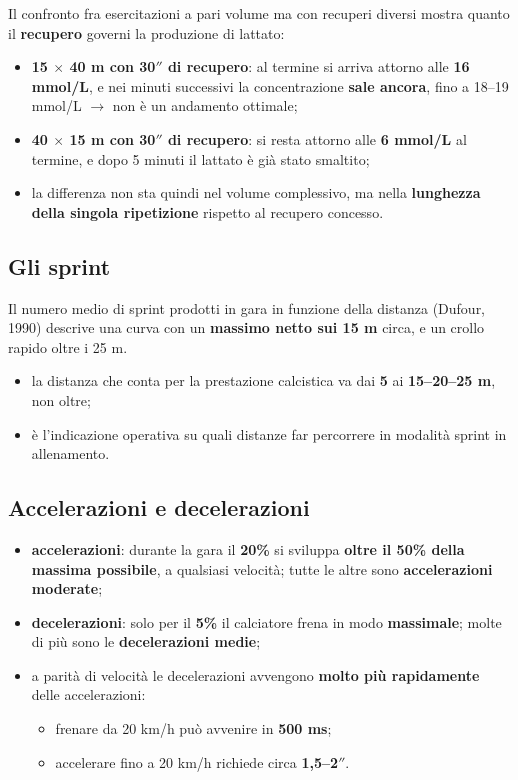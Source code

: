 Il confronto fra esercitazioni a pari volume ma con recuperi diversi mostra quanto il
\textbf{recupero} governi la produzione di lattato:
\begin{itemize}
  \item \textbf{15 $\times$ 40 m con 30$''$ di recupero}: al termine si arriva attorno alle
    \textbf{16 mmol/L}, e nei minuti successivi la concentrazione \textbf{sale ancora}, fino a
    18--19 mmol/L $\rightarrow$ non è un andamento ottimale;
  \item \textbf{40 $\times$ 15 m con 30$''$ di recupero}: si resta attorno alle \textbf{6 mmol/L}
    al termine, e dopo 5 minuti il lattato è già stato smaltito;
  \item la differenza non sta quindi nel volume complessivo, ma nella \textbf{lunghezza della
    singola ripetizione} rispetto al recupero concesso.
\end{itemize}

\subsection{Gli sprint}

Il numero medio di sprint prodotti in gara in funzione della distanza (Dufour, 1990) descrive una
curva con un \textbf{massimo netto sui 15 m} circa, e un crollo rapido oltre i 25 m.

\begin{itemize}
  \item la distanza che conta per la prestazione calcistica va dai \textbf{5} ai
    \textbf{15--20--25 m}, non oltre;
  \item è l'indicazione operativa su quali distanze far percorrere in modalità sprint in
    allenamento.
\end{itemize}

\subsection{Accelerazioni e decelerazioni}

\begin{itemize}
  \item \textbf{accelerazioni}: durante la gara il \textbf{20\%} si sviluppa \textbf{oltre il 50\%
    della massima possibile}, a qualsiasi velocità; tutte le altre sono \textbf{accelerazioni
    moderate};
  \item \textbf{decelerazioni}: solo per il \textbf{5\%} il calciatore frena in modo
    \textbf{massimale}; molte di più sono le \textbf{decelerazioni medie};
  \item a parità di velocità le decelerazioni avvengono \textbf{molto più rapidamente} delle
    accelerazioni:
    \begin{itemize}
      \item frenare da 20 km/h può avvenire in \textbf{500 ms};
      \item accelerare fino a 20 km/h richiede circa \textbf{1,5--2$''$}.
    \end{itemize}
\end{itemize}

